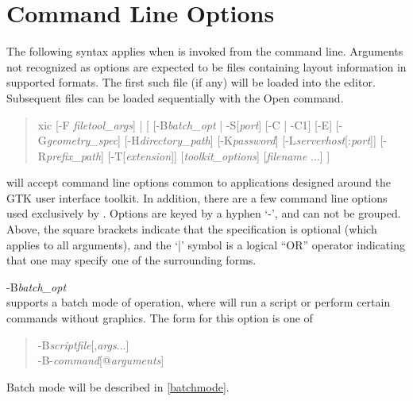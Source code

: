 \section{Command Line Options}

The following syntax applies when {\Xic} is invoked from the command
line.  Arguments not recognized as options are expected to be files
containing layout information in supported formats.  The first such file
(if any) will be loaded into the editor.  Subsequent files can be loaded
sequentially with the {\cb Open} command.

\vspace*{5mm}
\begin{quote}\vt \rr
xic [-F {\it filetool\_args\/}] | [
  [-B{\it batch\_opt\/} | -S[{\it port\/}]
  [-C | -C1] [-E] [-G{\it geometry\_spec\/}]
  [-H{\it directory\_path}]
  \hspace*{1em}[-K{\it password}] [-L{\it serverhost\/}[:{\it port\/}]]
  [-R{\it prefix\_path\/}]
  [-T[{\it extension\/}]]
  [{\it toolkit\_options\/}]
  \hspace*{1em}[{\it filename} ...] ]
\end{quote}

{\Xic} will accept command line options common to applications
designed around the GTK user interface toolkit.  In addition, there
are a few command line options used exclusively by {\Xic}.  Options
are keyed by a hyphen `{\vt -}', and can not be grouped.  Above, the square
brackets indicate that the specification is optional (which applies to
all arguments), and the `{\vt |}' symbol is a logical ``OR'' operator
indicating that one may specify one of the surrounding forms.

\begin{description}
\item{\et -B}{\it batch\_opt\/}\\
{\Xic} supports a batch mode of operation, where {\Xic} will run a
script or perform certain commands without graphics.  The form for
this option is one of
\begin{quote}\vt
  -B{\it scriptfile\/}[,{\it args\/}...]\\
  -B-{\it command}[{\vt @}{\it arguments\/}]
\end{quote}
Batch mode will be described in \ref{batchmode}.
\end{description}

